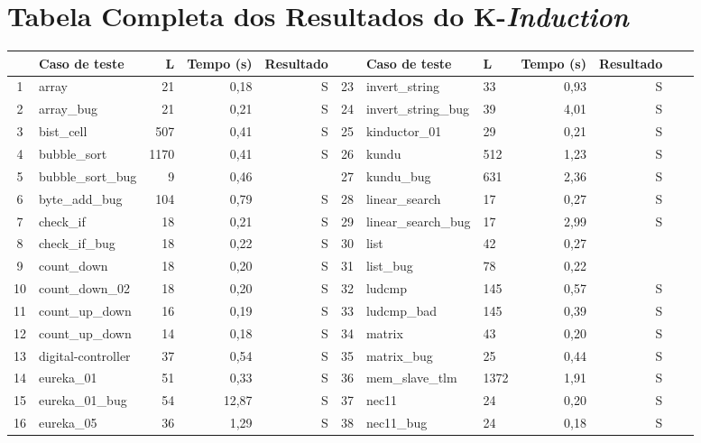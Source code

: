 \chapter{Tabela Completa dos Resultados do K-\textit{Induction}}
\label{appendix:Tabela-kinduction-full}

\begin{table*}[b!]
\renewcommand\arraystretch{1.18}
\setlength{\tabcolsep}{1.5pt}
\begin{center} {\small
\begin{tabular}{|c|l|r|r|r||r|l|l|r|r|r|c|}
\hline
	&\textbf{Caso de teste}		&\textbf{L}	&\textbf{Tempo (s)}	&\textbf{Resultado}	&	&\textbf{Caso de teste}		&\textbf{L}	&\textbf{Tempo (s)}	&\textbf{Resultado}	\\
\hline
1	&array			&21	&0,18		&S		&23	&invert\_string		&33	&0,93		&S		\\
\hline
2	&array\_bug		&21	&0,21		&S		&24	&invert\_string\_bug	&39	&4,01		&S		\\
\hline
3	&bist\_cell		&507	&0,41		&S		&25	&kinductor\_01		&29	&0,21		&S		\\
\hline
4	&bubble\_sort		&1170	&0,41		&S		&26	&kundu			&512	&1,23		&S		\\
\hline
5	&bubble\_sort\_bug	&9	&0,46		&\Cross		&27	&kundu\_bug		&631	&2,36		&S		\\
\hline
6	&byte\_add\_bug		&104	&0,79		&S		&28	&linear\_search		&17	&0,27		&S		\\
\hline
7	&check\_if		&18	&0,21		&S		&29	&linear\_search\_bug	&17	&2,99		&S		\\
\hline
8	&check\_if\_bug		&18	&0,22		&S		&30	&list			&42	&0,27		&\Cross		\\
\hline
9	&count\_down		&18	&0,20		&S		&31	&list\_bug		&78	&0,22		&\Cross		\\
\hline
10	&count\_down\_02	&18	&0,20		&S		&32	&ludcmp			&145	&0,57		&S		\\
\hline
11	&count\_up\_down	&16	&0,19		&S		&33	&ludcmp\_bad		&145	&0,39		&S		\\
\hline
12	&count\_up\_down	&14	&0,18		&S		&34	&matrix			&43	&0,20		&S		\\
\hline
13	&digital-controller	&37	&0,54		&S		&35	&matrix\_bug		&25	&0,44		&S		\\
\hline
14	&eureka\_01		&51	&0,33		&S		&36	&mem\_slave\_tlm	&1372	&1,91		&S		\\
\hline
15	&eureka\_01\_bug	&54	&12,87		&S		&37	&nec11			&24	&0,20		&S		\\
\hline
16	&eureka\_05		&36	&1,29		&S		&38	&nec11\_bug		&24	&0,18		&S		\\

\end{tabular}}
\end{center}
\end{table*}
